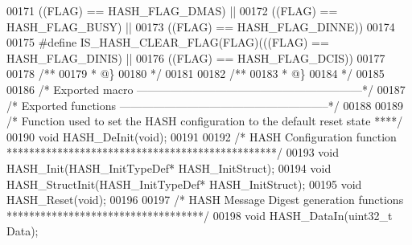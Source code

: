 \begin{DoxyCode}
00171                                 \textcolor{preprocessor}{(}\textcolor{preprocessor}{(}\textcolor{preprocessor}{FLAG}\textcolor{preprocessor}{)} \textcolor{preprocessor}{==} HASH_FLAG_DMAS\textcolor{preprocessor}{)}  \textcolor{preprocessor}{||}
00172                                 \textcolor{preprocessor}{(}\textcolor{preprocessor}{(}\textcolor{preprocessor}{FLAG}\textcolor{preprocessor}{)} \textcolor{preprocessor}{==} HASH_FLAG_BUSY\textcolor{preprocessor}{)}  \textcolor{preprocessor}{||}
00173                                 \textcolor{preprocessor}{(}\textcolor{preprocessor}{(}\textcolor{preprocessor}{FLAG}\textcolor{preprocessor}{)} \textcolor{preprocessor}{==} HASH_FLAG_DINNE\textcolor{preprocessor}{)}\textcolor{preprocessor}{)}
00174 
00175 \textcolor{preprocessor}{#}\textcolor{preprocessor}{define} \textcolor{preprocessor}{IS\_HASH\_CLEAR\_FLAG}\textcolor{preprocessor}{(}\textcolor{preprocessor}{FLAG}\textcolor{preprocessor}{)}\textcolor{preprocessor}{(}\textcolor{preprocessor}{(}\textcolor{preprocessor}{(}\textcolor{preprocessor}{FLAG}\textcolor{preprocessor}{)} \textcolor{preprocessor}{==} HASH_FLAG_DINIS\textcolor{preprocessor}{)} \textcolor{preprocessor}{||}
00176                                  \textcolor{preprocessor}{(}\textcolor{preprocessor}{(}\textcolor{preprocessor}{FLAG}\textcolor{preprocessor}{)} \textcolor{preprocessor}{==} HASH_FLAG_DCIS\textcolor{preprocessor}{)}\textcolor{preprocessor}{)}
00177 
00178 \textcolor{comment}{/**}
00179 \textcolor{comment}{  * @\}}
00180 \textcolor{comment}{  */}
00181 
00182 \textcolor{comment}{/**}
00183 \textcolor{comment}{  * @\}}
00184 \textcolor{comment}{  */}
00185 
00186 \textcolor{comment}{/* Exported macro ------------------------------------------------------------*/}
00187 \textcolor{comment}{/* Exported functions --------------------------------------------------------*/}
00188 
00189 \textcolor{comment}{/*  Function used to set the HASH configuration to the default reset state ****/}
00190 \textcolor{keywordtype}{void} HASH_DeInit(\textcolor{keywordtype}{void});
00191 
00192 \textcolor{comment}{/* HASH Configuration function ************************************************/}
00193 \textcolor{keywordtype}{void} HASH_Init(HASH\_InitTypeDef* HASH\_InitStruct);
00194 \textcolor{keywordtype}{void} HASH_StructInit(HASH\_InitTypeDef* HASH\_InitStruct);
00195 \textcolor{keywordtype}{void} HASH_Reset(\textcolor{keywordtype}{void});
00196 
00197 \textcolor{comment}{/* HASH Message Digest generation functions ***********************************/}
00198 \textcolor{keywordtype}{void} HASH_DataIn(uint32\_t Data);

\end{DoxyCode}
